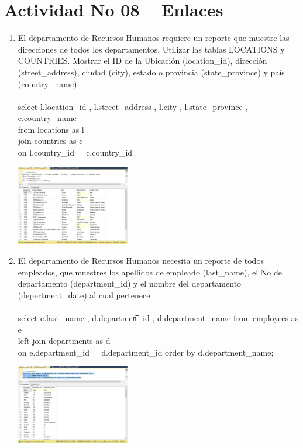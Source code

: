 \section{Actividad No 08 – Enlaces} 
		
\begin{enumerate}[1.]
	\item El departamento de Recursos Humanos requiere un reporte que muestre las direcciones de todos los departamentos. Utilizar las tablas LOCATIONS y COUNTRIES. Mostrar el ID de la Ubicación (location\_id), dirección (street\_address), ciudad (city), estado o provincia (state\_province) y país (country\_name). %
	\\
	\\select l.location\_id , l.street\_address , l.city , l.state\_province , c.country\_name 
	\\from locations as l 
	\\join countries as c 
	\\on l.country\_id = c.country\_id

	\begin{center}
	\includegraphics[width=5cm]{./Imagenes/8ejer1} 
	\end{center}


	\item El departamento de Recursos Humanos necesita un reporte de todos empleados, que muestres los apellidos de empleado (last\_name), el No de departamento (department\_id) y el nombre del departamento (depertment\_date) al cual pertenece. 
	\\
	\\select e.last\_name , d.departmen\t_id , d.department\_name from employees as e
	\\left join departments as d 
	\\on e.department\_id = d.department\_id order by d.department\_name;

	\begin{center}
	\includegraphics[width=5cm]{./Imagenes/8ejer2} 
	\end{center}


\end{enumerate}
